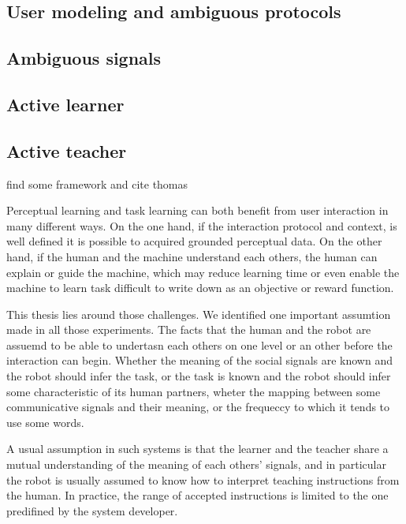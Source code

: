 \subsection{User modeling and ambiguous protocols}

\cite{macl11simul}

\subsection{Ambiguous signals}

\subsection{Active learner}

\subsection{Active teacher}


find some framework and cite thomas \cite{cederborg2013language}

Perceptual learning and task learning can both benefit from user interaction in many different ways. On the one hand, if the interaction protocol and context, is well defined it is possible to acquired grounded perceptual data. On the other hand, if the human and the machine understand each others, the human can explain or guide the machine, which may reduce learning time or even enable the machine to learn task difficult to write down as an objective or reward function.




This thesis lies around those challenges. We identified one important assumtion made in all those experiments. The facts that the human and the robot are assuemd to be able to undertasn each others on one level or an other before the interaction can begin. Whether the meaning of the social signals are known and the robot should infer the task, or the task is known and the robot should infer some characteristic of its human partners, wheter the mapping between some communicative signals and their meaning, or the frequeccy to which it tends to use some words.


A usual assumption in such
systems is that the learner and the teacher share a mutual
understanding of the meaning of each others' signals, and in
particular the robot is usually assumed to know how to interpret
teaching instructions from the human. In practice, the range
of accepted instructions is limited to the one predifined by the
system developer.

